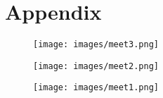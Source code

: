 \documentclass[12pt]{article}
\begin{document}
	\section{Appendix}
	\begin{figure}[H]
	\centering
	\label{Meeting1}
	\texttt{[image: images/meet3.png]}\\[0.5 cm]			
\end{figure}
	\begin{figure}[H]
	\centering
	\label{Meeting2}
	\texttt{[image: images/meet2.png]}\\[0.5 cm]			
\end{figure}
	\begin{figure}[H]
	\centering
	\label{Meeting3}
	\texttt{[image: images/meet1.png]}\\[0.5 cm]			
\end{figure}
	
	
\end{document}
